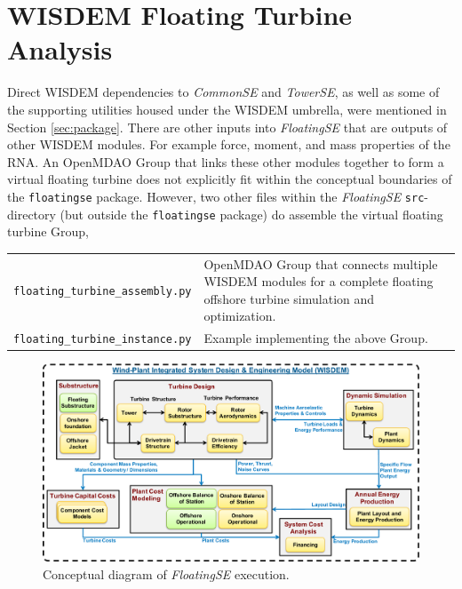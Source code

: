 
\section{WISDEM Floating Turbine Analysis}
Direct WISDEM dependencies to \textit{CommonSE} and \textit{TowerSE}, as well as some of the
supporting utilities housed under the WISDEM umbrella, were mentioned in
Section \ref{sec:package}.  There are other inputs into \textit{FloatingSE} that
are outputs of other WISDEM modules.  For example force, moment, and
mass properties of the RNA.  An OpenMDAO Group that links these other
modules together to form a virtual floating turbine does not explicitly
fit within the conceptual boundaries of the \texttt{floatingse} package.
However, two other files within the \textit{FloatingSE} \texttt{src}-directory
(but outside the \texttt{floatingse} package) do assemble the virtual
floating turbine Group,

{\small
\begin{tabularx}{\linewidth}{ l X }
\texttt{floating\_turbine\_assembly.py} & OpenMDAO Group that connects  multiple WISDEM modules for a complete floating offshore turbine simulation and optimization.\\
\texttt{floating\_turbine\_instance.py} & Example implementing the above Group.
\end{tabularx}
}

\begin{figure}
  \begin{center}
    \includegraphics[width=5in]{figs/new_wisdem}
    \caption{Conceptual diagram of \textit{FloatingSE} execution.}
    \label{fig:new_wisdem}
  \end{center}
\end{figure}

